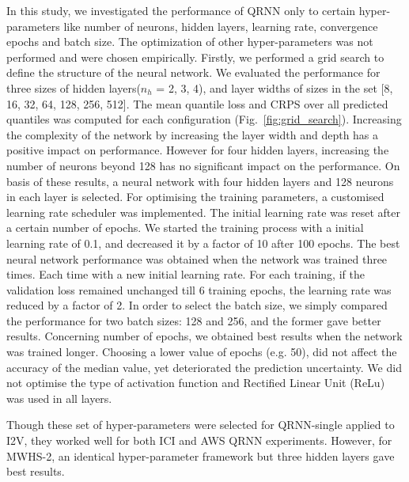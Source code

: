 \documentclass[amt, manuscript]{copernicus}
\begin{document}
In this study, we investigated the performance of QRNN only to certain hyper-parameters like number of neurons, hidden layers, learning rate, convergence epochs and batch size. The optimization of other hyper-parameters was not performed and were chosen empirically. Firstly, we performed a grid search to define the structure of the neural network. We evaluated the performance for three sizes of hidden layers($n_h$ = 2, 3, 4), and layer widths of sizes in the set [8, 16, 32, 64, 128, 256, 512]. The mean quantile loss and CRPS over all predicted quantiles was computed for each configuration (Fig.~\ref{fig:grid_search}). Increasing the complexity of the network by increasing the layer width and depth has a positive impact on performance. However for four hidden layers, increasing the number of neurons beyond 128 has no significant impact on the performance. On basis of these results, a neural network with four hidden layers and 128 neurons in each layer is selected. For optimising the training parameters, a customised  learning rate scheduler was implemented. The initial learning rate was reset after a certain number of epochs.  We started the training process with a initial learning rate of 0.1, and decreased it by a factor of 10 after 100 epochs. The best neural network performance was obtained when the network was trained three times. Each time with a new initial learning rate. For each training, if the validation loss remained unchanged till 6 training epochs, the learning rate was reduced by a factor of 2. 
In order to select the batch size, we simply compared the performance for two batch sizes: 128 and 256, and the former gave better results. Concerning number of epochs, we obtained best results when the network was trained longer. Choosing a lower value of epochs (e.g. 50), did not affect the accuracy of the median value, yet deteriorated the prediction uncertainty. We did not optimise the type of activation function and Rectified Linear Unit (ReLu) was used in all layers. 

Though these set of hyper-parameters were selected for QRNN-single applied to I2V, they worked well for both ICI and AWS QRNN experiments. However, for MWHS-2, an identical hyper-parameter framework but three hidden layers gave best results.  
\end{document}

